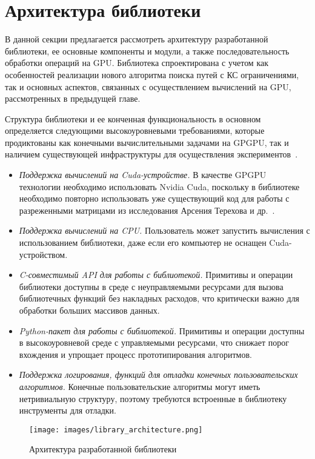\section{Архитектура библиотеки}

В данной секции предлагается рассмотреть архитектуру разработанной библиотеки, ее основные компоненты и модули, а также последовательность обработки операций на GPU. Библиотека спроектирована с учетом как особенностей реализации нового алгоритма поиска путей с КС ограничениями, так и основных аспектов, связанных с осуществлением вычислений на GPU, рассмотренных в предыдущей главе.

Структура библиотеки и ее конченная функциональность в основном определяется следующими высокоуровневыми требованиями, которые продиктованы как конечными вычислительными задачами на GPGPU, так и наличием существующей инфраструктуры для осуществления экспериментов~\cite{net:cfpq_py_algo}.

\begin{itemize}[noitemsep,topsep=0pt,parsep=0pt,partopsep=0pt]
    \item \textit{Поддержка вычислений на Cuda-устройстве.} В качестве GPGPU технологии необходимо использовать Nvidia Cuda, поскольку в библиотеке необходимо повторно использовать уже существующий код для работы с разреженными матрицами из исследования Арсения Терехова и др.~\cite{inproceedings:cfqp_matrix_with_single_source}.
    \item \textit{Поддержка вычислений на CPU.} Пользователь может запустить вычисления с использованием библиотеки, даже если его компьютер не оснащен Cuda-устройством.
    \item \textit{C-совместимый API для работы с библиотекой.} Примитивы и операции библиотеки доступны в среде с неуправляемыми ресурсами для вызова библиотечных функций без накладных расходов, что критически важно для обработки больших массивов данных.
    \item \textit{Python-пакет для работы с библиотекой.} Примитивы и операции доступны в высокоуровневой среде с управляемыми ресурсами, что снижает порог вхождения и упрощает процесс прототипирования алгоритмов.
    \item \textit{Поддержка логирования, функций для отладки конечных пользовательских алгоритмов.} Конечные пользовательские алгоритмы могут иметь нетривиальную структуру, поэтому требуются встроенные в библиотеку инструменты для отладки.
\end{itemize}

\begin{figure}[h]
    \centering
    \texttt{[image: images/library\_architecture.png]}
    \caption{Архитектура разработанной библиотеки}
    \label{fig:cubool_architecture}
\end{figure}

